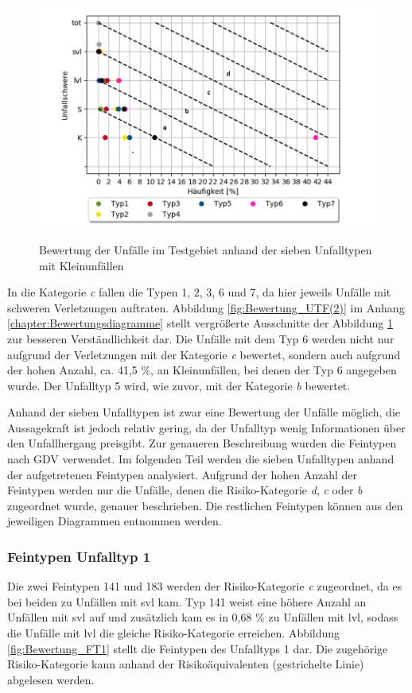 \begin{savenotes}
	\begin{figure}[H]
		\centering
		\includegraphics[width=12cm,height=8cm]{figures/Bewertung_UTF}
		\caption[Bewertung der Unfälle im Testgebiet anhand der sieben Unfalltypen mit Kleinunfällen]{Bewertung der Unfälle im Testgebiet anhand der sieben Unfalltypen mit Kleinunfällen}\label{fig:Bewertung_UTF}
	\end{figure}
\end{savenotes}

In die Kategorie \textit{c} fallen die Typen 1, 2, 3, 6 und 7, da hier jeweils Unfälle mit schweren Verletzungen auftraten. Abbildung \ref{fig:Bewertung_UTF(2)} im Anhang \ref{chapter:Bewertungsdiagramme} stellt vergrößerte Ausschnitte der Abbildung \ref{fig:Bewertung_UTF} zur besseren Verständlichkeit dar. Die Unfälle mit dem Typ 6 werden nicht nur aufgrund der Verletzungen mit der Kategorie \textit{c} bewertet, sondern auch aufgrund der hohen Anzahl, ca. 41,5 \%, an Kleinunfällen, bei denen der Typ 6 angegeben wurde. Der Unfalltyp 5 wird, wie zuvor, mit der Kategorie \textit{b} bewertet.

Anhand der sieben Unfalltypen ist zwar eine Bewertung der Unfälle möglich, die Aussagekraft ist jedoch relativ gering, da der Unfalltyp wenig Informationen über den Unfallhergang preisgibt. Zur genaueren Beschreibung wurden die Feintypen nach GDV verwendet. Im folgenden Teil werden die sieben Unfalltypen anhand der aufgetretenen Feintypen analysiert. Aufgrund der hohen Anzahl der Feintypen werden nur die Unfälle, denen die Risiko-Kategorie \textit{d}, \textit{c} oder \textit{b} zugeordnet wurde, genauer beschrieben. Die restlichen Feintypen können aus den jeweiligen Diagrammen entnommen werden.

\subsubsection{Feintypen Unfalltyp 1}
Die zwei Feintypen 141 und 183 werden der Risiko-Kategorie \textit{c} zugeordnet, da es bei beiden zu Unfällen mit \ac{svl} kam. Typ 141 weist eine höhere Anzahl an Unfällen mit \ac{svl} auf und zusätzlich kam es in 0,68 \% zu Unfällen mit \ac{lvl}, sodass die Unfälle mit \ac{lvl} die gleiche Risiko-Kategorie erreichen. Abbildung \ref{fig:Bewertung_FT1} stellt die Feintypen des Unfalltyps 1 dar. Die zugehörige Risiko-Kategorie kann anhand der Risikoäquivalenten (gestrichelte Linie) abgelesen werden.

